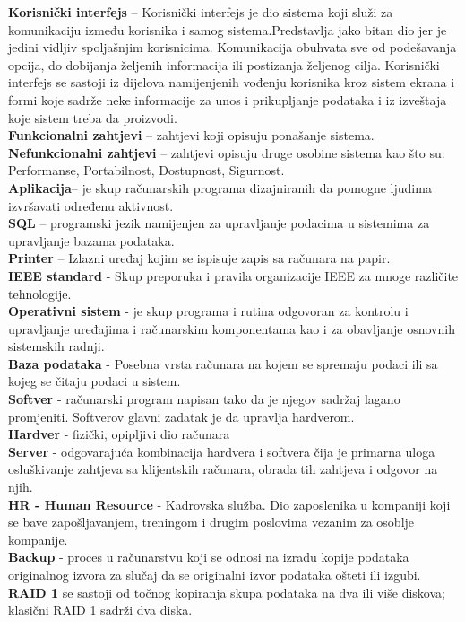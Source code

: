 \documentclass[]{report}
\begin{document}
\textbf{Korisnički interfejs} – Korisnički interfejs je dio sistema koji služi za komunikaciju između korisnika i samog sistema.Predstavlja jako bitan dio jer je jedini vidljiv spoljašnjim korisnicima. Komunikacija obuhvata sve od podešavanja opcija, do dobijanja željenih informacija ili postizanja željenog cilja. Korisnički interfejs se sastoji iz dijelova namijenjenih vođenju korisnika kroz sistem ekrana i formi koje sadrže neke informacije za unos i prikupljanje podataka i iz izveštaja koje sistem treba da proizvodi. 
\noindent\\
\textbf{Funkcionalni zahtjevi} – zahtjevi koji opisuju ponašanje sistema. 
\noindent\\
\textbf{Nefunkcionalni zahtjevi} – zahtjevi opisuju druge osobine sistema kao što su: Performanse, Portabilnost, Dostupnost, Sigurnost. 
\noindent\\
\textbf{Aplikacija}– je skup računarskih programa dizajniranih da pomogne ljudima izvršavati određenu aktivnost. 
\noindent\\
\textbf{SQL} – programski jezik namijenjen za upravljanje podacima u  sistemima za upravljanje bazama podataka. 
\noindent\\
\textbf{Printer} – Izlazni uređaj kojim se ispisuje zapis sa računara na papir. 
\noindent\\
\textbf{IEEE standard }- Skup preporuka i pravila organizacije IEEE za mnoge različite tehnologije.
\noindent\\
\textbf{Operativni sistem} - je skup programa i rutina odgovoran za kontrolu i upravljanje uređajima i računarskim komponentama kao i za obavljanje osnovnih sistemskih radnji.
 \noindent\\
\textbf{Baza podataka} - Posebna vrsta računara na kojem se spremaju podaci ili sa kojeg se čitaju podaci u sistem. 
 \noindent\\
\textbf{Softver} -  računarski program napisan tako da je njegov sadržaj lagano promjeniti. Softverov glavni zadatak je da upravlja hardverom. 
\noindent\\
\textbf{Hardver} - fizički, opipljivi dio računara 
\noindent\\
\textbf{Server} - odgovarajuća kombinacija hardvera i softvera čija je primarna uloga  osluškivanje zahtjeva sa klijentskih računara, obrada tih zahtjeva i odgovor na  njih.  
 \noindent\\
\textbf{HR - Human Resource }- Kadrovska služba. Dio zaposlenika u kompaniji koji se  bave zapošljavanjem, treningom i drugim poslovima vezanim za  osoblje kompanije. 
 \noindent\\
\textbf{Backup} - proces u računarstvu koji se odnosi na izradu kopije podataka originalnog izvora za slučaj da se originalni izvor podataka ošteti ili izgubi. 
\textbf{RAID 1 } se sastoji od točnog kopiranja  skupa podataka na dva ili više diskova; klasični  RAID 1 sadrži dva diska.
 \noindent\\
\end{document}
